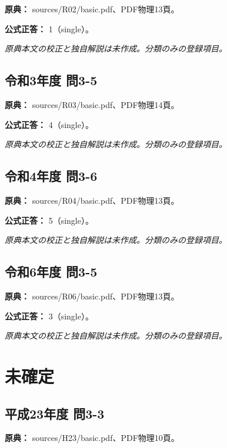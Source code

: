 \noindent\textbf{原典：} sources/R02/basic.pdf、PDF物理13頁。

\textbf{公式正答：} 1（single）。

\par\textit{原典本文の校正と独自解説は未作成。分類のみの登録項目。}

\subsection{令和3年度 問3-5}
\label{q:r03-reg-basic-3-5}

\noindent\textbf{原典：} sources/R03/basic.pdf、PDF物理14頁。

\textbf{公式正答：} 4（single）。

\par\textit{原典本文の校正と独自解説は未作成。分類のみの登録項目。}

\subsection{令和4年度 問3-6}
\label{q:r04-reg-basic-3-6}

\noindent\textbf{原典：} sources/R04/basic.pdf、PDF物理13頁。

\textbf{公式正答：} 5（single）。

\par\textit{原典本文の校正と独自解説は未作成。分類のみの登録項目。}

\subsection{令和6年度 問3-5}
\label{q:r06-reg-basic-3-5}

\noindent\textbf{原典：} sources/R06/basic.pdf、PDF物理13頁。

\textbf{公式正答：} 3（single）。

\par\textit{原典本文の校正と独自解説は未作成。分類のみの登録項目。}

\section{未確定}

\subsection{平成23年度 問3-3}
\label{q:h23-reg-basic-3-3}

\noindent\textbf{原典：} sources/H23/basic.pdf、PDF物理10頁。

